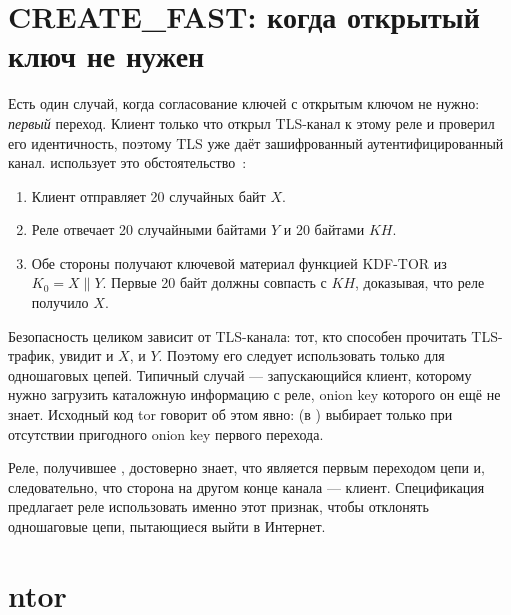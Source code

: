 \section{CREATE\_FAST: когда открытый ключ не нужен}\label{sec:create-fast}

Есть один случай, когда согласование ключей с открытым ключом не нужно: \emph{первый} переход. Клиент только что открыл TLS-канал к этому реле и проверил его идентичность, поэтому TLS уже даёт зашифрованный аутентифицированный канал.  использует это обстоятельство~:
\begin{enumerate}
  \item Клиент отправляет 20 случайных байт $X$.
  \item Реле отвечает 20 случайными байтами $Y$ и 20 байтами $KH$.
  \item Обе стороны получают ключевой материал функцией KDF-TOR из $K_0 = X \| Y$. Первые 20 байт должны совпасть с $KH$, доказывая, что реле получило $X$.
\end{enumerate}

Безопасность  целиком зависит от TLS-канала: тот, кто способен прочитать TLS-трафик, увидит и $X$, и $Y$. Поэтому его следует использовать только для одношаговых цепей. Типичный случай --- запускающийся клиент, которому нужно загрузить каталожную информацию с реле, onion key которого он ещё не знает. Исходный код tor говорит об этом явно:  (в ) выбирает  только при отсутствии пригодного onion key первого перехода.

\begin{attenzione}
Реле, получившее , достоверно знает, что является первым переходом цепи и, следовательно, что сторона на другом конце канала --- клиент. Спецификация предлагает реле использовать именно этот признак, чтобы отклонять одношаговые цепи, пытающиеся выйти в Интернет.
\end{attenzione}

\section{ntor}\label{sec:ntor}

